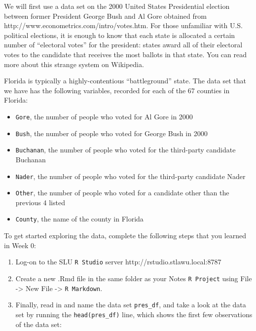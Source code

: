 \documentclass[
]{book}
\providecommand{\tightlist}{%
  \setlength{\itemsep}{0pt}\setlength{\parskip}{0pt}}
\begin{document}
We will first use a data set on the 2000 United States Presidential election between former President George Bush and Al Gore obtained from http://www.econometrics.com/intro/votes.htm. For those unfamiliar with U.S. political elections, it is enough to know that each state is allocated a certain number of ``electoral votes'' for the president: states award all of their electoral votes to the candidate that receives the most ballots in that state. You can read more about this strange system on Wikipedia.

Florida is typically a highly-contentious ``battleground'' state. The data set that we have has the following variables, recorded for each of the 67 counties in Florida:

\begin{itemize}
\tightlist
\item
  \texttt{Gore}, the number of people who voted for Al Gore in 2000
\item
  \texttt{Bush}, the number of people who voted for George Bush in 2000
\item
  \texttt{Buchanan}, the number of people who voted for the third-party candidate Buchanan
\item
  \texttt{Nader}, the number of people who voted for the third-party candidate Nader
\item
  \texttt{Other}, the number of people who voted for a candidate other than the previous 4 listed
\item
  \texttt{County}, the name of the county in Florida
\end{itemize}

To get started exploring the data, complete the following steps that you learned in Week 0:

\begin{enumerate}
\def\labelenumi{\arabic{enumi}.}
\item
  Log-on to the SLU \texttt{R\ Studio} server http://rstudio.stlawu.local:8787
\item
  Create a new .Rmd file in the same folder as your Notes \texttt{R\ Project} using File -\textgreater{} New File -\textgreater{} \texttt{R\ Markdown}.
\item
  Finally, read in and name the data set \texttt{pres\_df}, and take a look at the data set by running the \texttt{head(pres\_df)} line, which shows the first few observations of the data set:
\end{enumerate}
\end{document}
